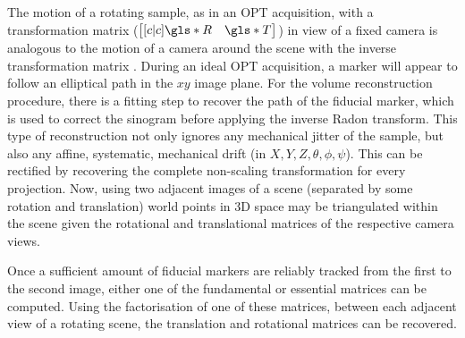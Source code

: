 \documentclass{osa-article}
\begin{document}
The motion of a rotating sample, as in an OPT acquisition, with a transformation matrix (\( \begin{bmatrix}[c|c] \gls*{R} & \gls*{T} \end{bmatrix}\)) in view of a fixed camera is analogous to the motion of a camera around the scene with the inverse transformation matrix . %
During an ideal OPT acquisition, a marker will appear to follow an elliptical path in the \(xy\) image plane.
For the volume reconstruction procedure, there is a fitting step to recover the path of the fiducial marker, which is used to correct the sinogram before applying the inverse Radon transform.
This type of reconstruction not only ignores any mechanical jitter of the sample, but also any affine, systematic, mechanical drift (in \(X,Y,Z,\theta,\phi,\psi \)). %
This can be rectified by recovering the complete non-scaling transformation for every projection.
Now, using two adjacent images of a scene (separated by some rotation and translation) world points in 3D space may be triangulated within the scene given the rotational and translational matrices of the respective camera views.



Once a sufficient amount of fiducial markers are reliably tracked from the first to the second image, either one of the fundamental or essential matrices can be computed.
Using the factorisation of one of these matrices, between each adjacent view of a rotating scene, the translation and rotational matrices can be recovered.
\end{document}
